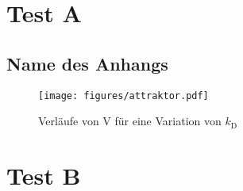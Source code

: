 

\chapter{Test A}
\section{Name des Anhangs}

\begin{figure}[H]
	\centering
	\texttt{[image: figures/attraktor.pdf]}
	\caption{Verläufe von V für eine Variation von $k_\mathrm{D}$}
	\label{fig:kd_var}
\end{figure}



\chapter{Test B}
